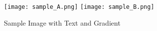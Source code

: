 \documentclass{article}
\begin{document}
\begin{figure}[h]
    \centering
    \texttt{[image: sample\_A.png]}
    \texttt{[image: sample\_B.png]}
    \caption{Sample Image with Text and Gradient}
    \label{fig:sample_image}
\end{figure}
\end{document}
